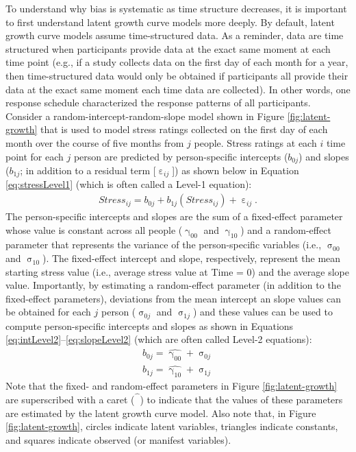 \documentclass[
12pt, %
twoside,
english]{guelphthesis}
\begin{document}
To understand why bias is systematic as time structure decreases, it is important to first understand latent growth curve models more deeply. By default, latent growth curve models assume time-structured data. As a reminder, data are time structured when participants provide data at the exact same moment at each time point (e.g., if a study collects data on the first day of each month for a year, then time-structured data would only be obtained if participants all provide their data at the exact same moment each time data are collected). In other words, one response schedule characterized the response patterns of all participants. Consider a random-intercept-random-slope model shown in Figure \ref{fig:latent-growth} that is used to model stress ratings collected on the first day of each month over the course of five months from \(j\) people. Stress ratings at each \(i\) time point for each \(j\) person are predicted by person-specific intercepts (\(b_{0j}\)) and slopes (\(b_{1j}\); in addition to a residual term {[}\(\upepsilon_{ij}\){]}) as shown below in Equation \ref{eq:stressLevel1} (which is often called a Level-1 equation):
\begin{align}
  Stress_{ij} = b_{0j} + b_{1j}(Stress_{ij}) + \upepsilon_{ij}.
  \label{eq:stressLevel1}
\end{align}
\noindent The person-specific intercepts and slopes are the sum of a fixed-effect parameter whose value is constant across all people (\(\upgamma_{00}\) and \(\upgamma_{10}\)) and a random-effect parameter that represents the variance of the person-specific variables (i.e., \(\upsigma_{00}\) and \(\upsigma_{10}\)). The fixed-effect intercept and slope, respectively, represent the mean starting stress value (i.e., average stress value at Time = 0) and the average slope value. Importantly, by estimating a random-effect parameter (in addition to the fixed-effect parameters), deviations from the mean intercept an slope values can be obtained for each \(j\) person (\(\upsigma_{0j}\) and \(\upsigma_{1j}\)) and these values can be used to compute person-specific intercepts and slopes as shown in Equations \ref{eq:intLevel2}--\ref{eq:slopeLevel2} (which are often called Level-2 equations):
\begin{align}
  b_{0j} = \hat{\upgamma_{00}} + \upsigma_{0j} \label{eq:intLevel2} \\
  b_{1j} = \hat{\upgamma_{10}} + \upsigma_{1j} \label{eq:slopeLevel2}
\end{align}
\noindent Note that the fixed- and random-effect parameters in Figure \ref{fig:latent-growth} are superscribed with a caret (\(\hat{\phantom{\beta}}\)) to indicate that the values of these parameters are estimated by the latent growth curve model. Also note that, in Figure \ref{fig:latent-growth}, circles indicate latent variables, triangles indicate constants, and squares indicate observed (or manifest variables).
\end{document}
